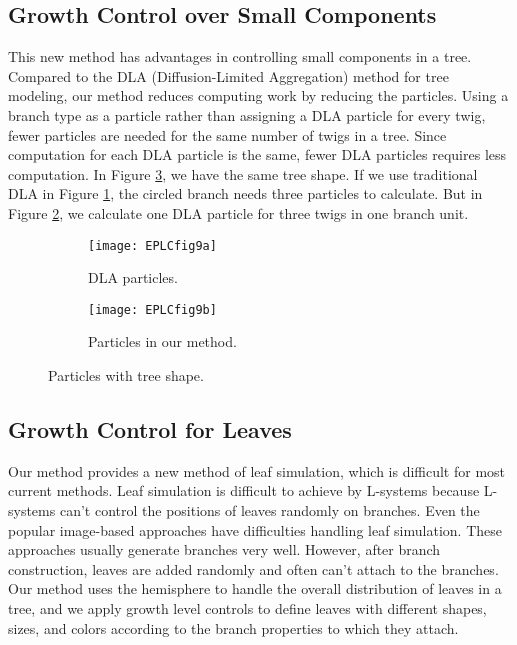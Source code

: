 \subsection{Growth Control over Small Components}

This new method has advantages in controlling small components in a tree. Compared to the DLA (Diffusion-Limited Aggregation) method \cite{Vicsek1992,Kim2007} for tree modeling, our method reduces computing work by reducing the particles. Using a branch type as a particle rather than assigning a DLA particle for every twig, fewer particles are needed for the same number of twigs in a tree. Since computation for each DLA particle is the same, fewer DLA particles requires less computation. In Figure \ref{fig:EPLCfig9}, we have the same tree shape. If we use traditional DLA in Figure \ref{fig:sub1EPLCfig9}, the circled branch needs three particles to calculate. But in Figure \ref{fig:sub2EPLCfig9}, we calculate one DLA particle for three twigs in one branch unit.
 
\begin{figure}
\centering
        \begin{subfigure}[b]{0.7\textwidth}
                \centering
                \texttt{[image: EPLCfig9a]}
                \caption{DLA particles.}
                \label{fig:sub1EPLCfig9}
        \end{subfigure}
        \begin{subfigure}[b]{0.7\textwidth}
                \centering
                \texttt{[image: EPLCfig9b]}
                \caption{Particles in our method.}
                \label{fig:sub2EPLCfig9}
        \end{subfigure}   
        \caption{Particles with tree shape.}
        \label{fig:EPLCfig9}
\end{figure} 

\subsection{Growth Control for Leaves}

Our method provides a new method of leaf simulation, which is difficult for most current methods. Leaf simulation is difficult to achieve by L-systems because L-systems can't control the positions of leaves randomly on branches. Even the popular image-based approaches have difficulties handling leaf simulation. These approaches usually generate branches very well. However, after branch construction, leaves are added randomly and often can't attach to the branches. Our method uses the hemisphere to handle the overall distribution of leaves in a tree, and we apply growth level controls to define leaves with different shapes, sizes, and colors according to the branch properties to which they attach.

